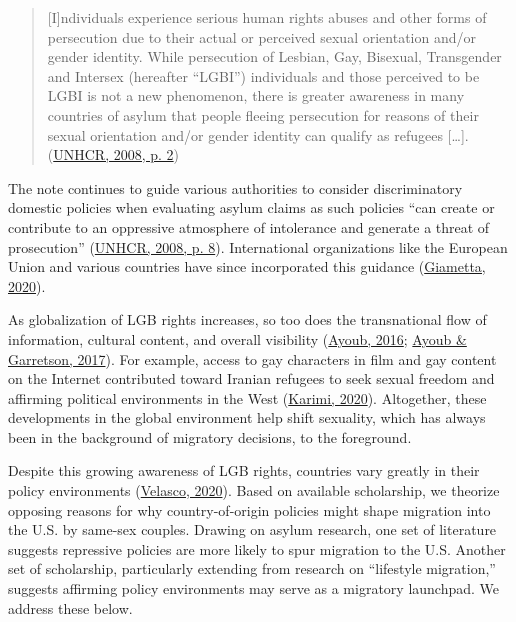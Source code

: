 \documentclass[
  11pt,
]{article}
\begin{document}
\begin{quote}
{[}I{]}ndividuals experience serious human rights abuses and other forms of persecution due to their actual or perceived sexual orientation and/or gender identity. While persecution of Lesbian, Gay, Bisexual, Transgender and Intersex (hereafter ``LGBI'') individuals and those perceived to be LGBI is not a new phenomenon, there is greater awareness in many countries of asylum that people fleeing persecution for reasons of their sexual orientation and/or gender identity can qualify as refugees {[}\ldots{]}. (\protect\hyperlink{ref-unhcr_2008}{UNHCR, 2008, p. 2})
\end{quote}

The note continues to guide various authorities to consider discriminatory domestic policies when evaluating asylum claims as such policies ``can create or contribute to an oppressive atmosphere of intolerance and generate a threat of prosecution'' (\protect\hyperlink{ref-unhcr_2008}{UNHCR, 2008, p. 8}). International organizations like the European Union and various countries have since incorporated this guidance (\protect\hyperlink{ref-giametta_2020}{Giametta, 2020}).

As globalization of LGB rights increases, so too does the transnational flow of information, cultural content, and overall visibility (\protect\hyperlink{ref-ayoub_2016}{Ayoub, 2016}; \protect\hyperlink{ref-ayoub_2017}{Ayoub \& Garretson, 2017}). For example, access to gay characters in film and gay content on the Internet contributed toward Iranian refugees to seek sexual freedom and affirming political environments in the West (\protect\hyperlink{ref-karimi_2020}{Karimi, 2020}). Altogether, these developments in the global environment help shift sexuality, which has always been in the background of migratory decisions, to the foreground.

Despite this growing awareness of LGB rights, countries vary greatly in their policy environments (\protect\hyperlink{ref-velasco_2020}{Velasco, 2020}). Based on available scholarship, we theorize opposing reasons for why country-of-origin policies might shape migration into the U.S. by same-sex couples. Drawing on asylum research, one set of literature suggests repressive policies are more likely to spur migration to the U.S. Another set of scholarship, particularly extending from research on ``lifestyle migration,'' suggests affirming policy environments may serve as a migratory launchpad. We address these below.
\end{document}
